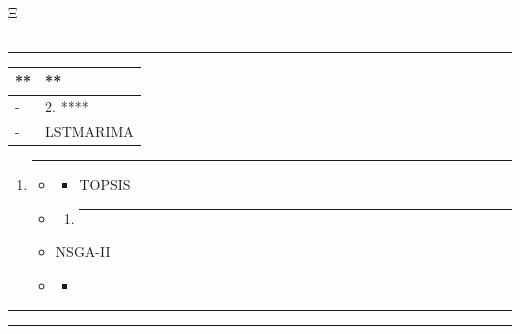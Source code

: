 Ξ

\subsection{}\label{section-55}

\begin{center}\rule{0.5\linewidth}{0.5pt}\end{center}

\begin{longtable}[]{@{}ll@{}}
\toprule\noalign{}
** & ** \\
\midrule\noalign{}
\endhead
\bottomrule\noalign{}
\endlastfoot
- & 2. **** \\
- & LSTMARIMA \\
\end{longtable}

\begin{enumerate}
\def\labelenumi{\arabic{enumi}.}
\item
  \begin{center}\rule{0.5\linewidth}{0.5pt}\end{center}

  \begin{itemize}
  \item
    \begin{itemize}
    \tightlist
    \item
      TOPSIS
    \end{itemize}
  \item
    \begin{enumerate}
    \def\labelenumii{\arabic{enumii}.}
        \item
      \begin{center}\rule{0.5\linewidth}{0.5pt}\end{center}
    \end{enumerate}
  \item
    NSGA-II
  \item
    \begin{itemize}
    \tightlist
    \item
    \end{itemize}
  \end{itemize}
\end{enumerate}

\begin{center}\rule{0.5\linewidth}{0.5pt}\end{center}

\begin{center}\rule{0.5\linewidth}{0.5pt}\end{center}

